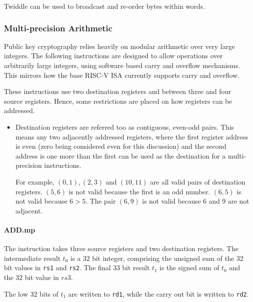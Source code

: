 Twiddle can be used to broadcast and re-order bytes within words.


\subsubsection{Multi-precision Arithmetic}

Public key cryptography relies heavily on modular arithmetic over very
large integers. The following instructions are designed to allow
operations over arbitrarily large integers, using software based carry
and overflow mechanisms. This mirrors how the base RISC-V ISA currently
supports carry and overflow.

These instructions use two destination registers and between three
and four source registers. Hence, some restrictions are placed on how
registers can be addressed.

\begin{itemize}
\item Destination registers are referred too as contiguous, even-odd
pairs. This means any two adjacently addressed registers, where the
first register address is even (zero being considered even for this
discussion) and the second address is one more than the first can be
used as the destination for a multi-precision instructions. 

For example, $(0,1), (2,3)$ and $(10,11)$ are all valid
pairs of destination registers. $(5,6)$ is not valid because the first
is an odd number. $(6,5)$ is not valid because $6 > 5$. The pair $(6,9)$
is not valid because $6$ and $9$ are not adjacent.
\end{itemize}

\paragraph{ADD.mp}

The  instruction takes three source registers and two
destination registers. The intermediate result $t_0$ is a $32$
bit integer, comprising the unsigned sum of the $32$ bit values in
{\tt rs1} and {\tt rs2}. The final $33$ bit result $t_1$ is the signed
sum of $t_0$ and the $32$ bit value in $rs3$.

The low $32$ bits of $t_1$ are written to {\tt rd1}, while the carry out
bit is written to {\tt rd2}.

